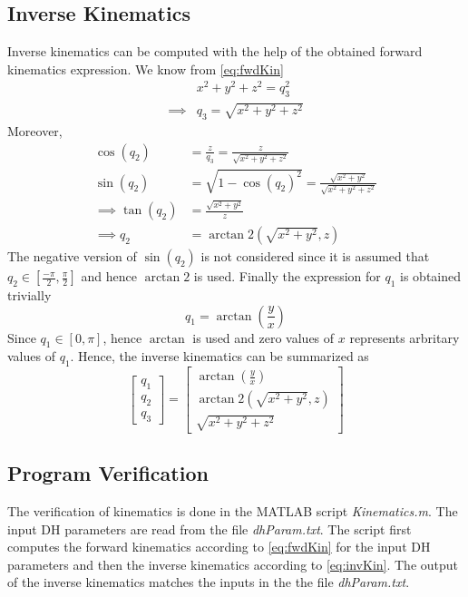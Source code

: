 \subsection{Inverse Kinematics}
Inverse kinematics can be computed with the help of the obtained forward kinematics expression. We know from \eqref{eq:fwdKin}
\begin{align*}
	&x^2 + y^2 + z^2 = q_3^2 \\
	\implies&q_3 = \sqrt{x^2 + y^2 + z^2}
\end{align*}
Moreover,
\begin{align*}
	\cos\left(q_2\right) &= \frac{z}{q_3} = \frac{z}{\sqrt{x^2 + y^2 + z^2}}\\
	\sin\left(q_2\right) &= \sqrt{1 - \cos\left(q_2\right)^2} = \frac{\sqrt{x^2 + y^2}}{\sqrt{x^2 + y^2 + z^2}} \\
	\implies \tan\left(q_2\right) &= \frac{\sqrt{x^2 + y^2}}{z} \\
	\implies q_2 &= \arctan2\left(\sqrt{x^2 + y^2},z\right)
\end{align*}
The negative version of $\sin\left(q_2\right)$ is not considered since it is assumed that $q_2 \in \left[\frac{-\pi}{2},\frac{\pi}{2}\right]$ and hence $\arctan2$ is used. Finally the expression for $q_1$ is obtained trivially
\begin{equation*}
	q_1 = \arctan\left(\frac{y}{x}\right)
\end{equation*}
Since $q_1 \in \left[0,\pi\right]$, hence $\arctan$ is used and zero values of $x$ represents arbritary values of $q_1$.
Hence, the inverse kinematics can be summarized as 
\begin{equation}
	\begin{bmatrix}
		q_1\\
		q_2\\
		q_3
	\end{bmatrix} = \begin{bmatrix}
	\arctan\left(\frac{y}{x}\right)\\
	\arctan2\left(\sqrt{x^2 + y^2},z\right)\\
	\sqrt{x^2 + y^2 + z^2}
\end{bmatrix}
\label{eq:invKin}
\end{equation}
\subsection{Program Verification}
The verification of kinematics is done in the MATLAB\textsuperscript{\textregistered} script \emph{Kinematics.m}. The input DH parameters are read from the file \emph{dhParam.txt}. The script first computes the forward kinematics according to \eqref{eq:fwdKin} for the input DH parameters and then the inverse kinematics according to \eqref{eq:invKin}. The output of the inverse kinematics matches the inputs in the the file \emph{dhParam.txt}.

